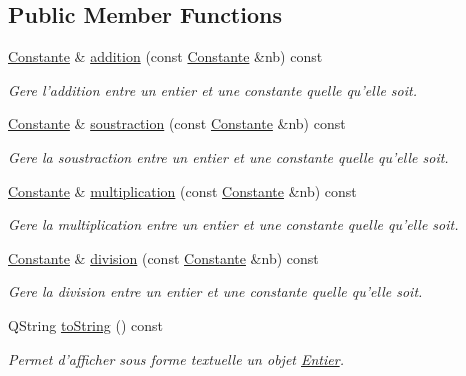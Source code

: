 \subsection*{\-Public \-Member \-Functions}
\begin{DoxyCompactItemize}
\item 
\hyperlink{class_l_o21_1_1_constante}{\-Constante} \& \hyperlink{class_l_o21_1_1_entier_a8c70a23f95a29034d78fc5b8c76c4265}{addition} (const \hyperlink{class_l_o21_1_1_constante}{\-Constante} \&nb) const 
\begin{DoxyCompactList}\small\item\em \-Gere l'addition entre un entier et une constante quelle qu'elle soit. \end{DoxyCompactList}\item 
\hyperlink{class_l_o21_1_1_constante}{\-Constante} \& \hyperlink{class_l_o21_1_1_entier_aa9ebbf0b51016b7e14a12909ed6ab7bb}{soustraction} (const \hyperlink{class_l_o21_1_1_constante}{\-Constante} \&nb) const 
\begin{DoxyCompactList}\small\item\em \-Gere la soustraction entre un entier et une constante quelle qu'elle soit. \end{DoxyCompactList}\item 
\hyperlink{class_l_o21_1_1_constante}{\-Constante} \& \hyperlink{class_l_o21_1_1_entier_a34fdbc8acc0a18318916312983dc78f9}{multiplication} (const \hyperlink{class_l_o21_1_1_constante}{\-Constante} \&nb) const 
\begin{DoxyCompactList}\small\item\em \-Gere la multiplication entre un entier et une constante quelle qu'elle soit. \end{DoxyCompactList}\item 
\hyperlink{class_l_o21_1_1_constante}{\-Constante} \& \hyperlink{class_l_o21_1_1_entier_a4a9e09753bde4c527596c9a2cda8c87e}{division} (const \hyperlink{class_l_o21_1_1_constante}{\-Constante} \&nb) const 
\begin{DoxyCompactList}\small\item\em \-Gere la division entre un entier et une constante quelle qu'elle soit. \end{DoxyCompactList}\item 
\-Q\-String \hyperlink{class_l_o21_1_1_entier_a8741d3caf244a1993d478b7353b5a65e}{to\-String} () const 
\begin{DoxyCompactList}\small\item\em \-Permet d'afficher sous forme textuelle un objet \hyperlink{class_l_o21_1_1_entier}{\-Entier}. \end{DoxyCompactList}\item 

\end{DoxyCompactItemize}
